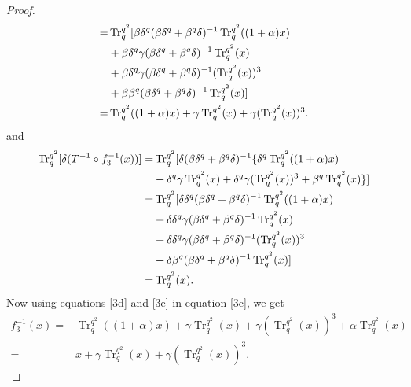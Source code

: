 \documentclass{birkjour}
\theoremstyle{definition}
\theoremstyle{remark}
\numberwithin{equation}{section}
\begin{document}
\begin{proof}
\begin{align}
		=&\operatorname{Tr}_{q}^{q^2}[\beta\delta^{q}(\beta\delta^{q}+\beta^{q}\delta)^{-1}\operatorname{Tr}_{q}^{q^2}((1+\alpha)x)\notag\\&+\beta\delta^{q}\gamma(\beta\delta^{q}+\beta^{q}\delta)^{-1}\operatorname{Tr}_{q}^{q^2}(x)\notag\\&+\beta\delta^{q}\gamma(\beta\delta^{q}+\beta^{q}\delta)^{-1}(\operatorname{Tr}_{q}^{q^2}(x))^3\notag\\&+\beta\beta^{q}(\beta\delta^{q}+\beta^{q}\delta)^{-1}\operatorname{Tr}_{q}^{q^2}(x)]\notag\\
		=&\operatorname{Tr}_{q}^{q^2}((1+\alpha)x)+\gamma\operatorname{Tr}_{q}^{q^2}(x)+\gamma(\operatorname{Tr}_{q}^{q^2}(x))^3.\label{3d}
	\end{align}
	and
	\begin{align}
		\operatorname{Tr}_{q}^{q^2}[\delta (T^{-1}\circ f_3^{-1}(x))]=&\operatorname{Tr}_{q}^{q^2}[\delta (\beta\delta^{q}+\beta^{q}\delta)^{-1}\{\delta^{q}\operatorname{Tr}_{q}^{q^2}((1+\alpha)x)\notag\\&+\delta^{q}\gamma\operatorname{Tr}_{q}^{q^2}(x)+\delta^{q}\gamma(\operatorname{Tr}_{q}^{q^2}(x))^3+\beta^{q}\operatorname{Tr}_{q}^{q^2}(x)\}]\notag\\
		=&\operatorname{Tr}_{q}^{q^2}[\delta\delta^{q}(\beta\delta^{q}+\beta^{q}\delta)^{-1}\operatorname{Tr}_{q}^{q^2}((1+\alpha)x)\notag\\&+\delta\delta^{q}\gamma(\beta\delta^{q}+\beta^{q}\delta)^{-1}\operatorname{Tr}_{q}^{q^2}(x)\notag\\&+\delta\delta^{q}\gamma(\beta\delta^{q}+\beta^{q}\delta)^{-1}(\operatorname{Tr}_{q}^{q^2}(x))^3\notag\\&+\delta\beta^{q}(\beta\delta^{q}+\beta^{q}\delta)^{-1}\operatorname{Tr}_{q}^{q^2}(x)]\notag\\
		=&\operatorname{Tr}_{q}^{q^2}(x).\label{3e}
	\end{align}
	Now using equations \ref{3d} and \ref{3e} in equation \ref{3c}, we get
	\begin{align*}
		f_3^{-1}(x)=&\operatorname{Tr}_{q}^{q^2}((1+\alpha)x)+\gamma\operatorname{Tr}_{q}^{q^2}(x)+\gamma(\operatorname{Tr}_{q}^{q^2}(x))^3+\alpha\operatorname{Tr}_{q}^{q^2}(x)\\
		=&x+\gamma\operatorname{Tr}_{q}^{q^2}(x)+\gamma(\operatorname{Tr}_{q}^{q^2}(x))^3.
	\end{align*}
	

\end{proof}
\end{document}
